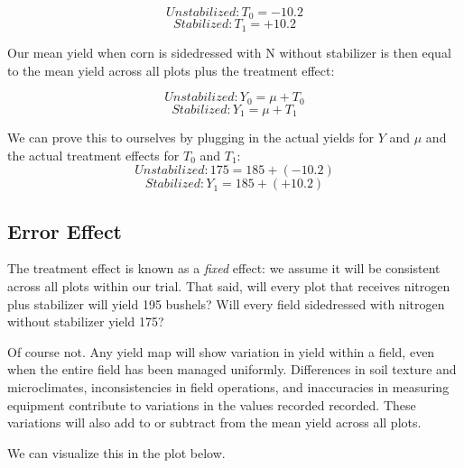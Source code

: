 \documentclass[
]{book}
\begin{document}
\[Unstabilized : T_0 = -10.2\]
\[Stabilized: T_1 = +10.2\]

Our mean yield when corn is sidedressed with N without stabilizer is then equal to the mean yield across all plots plus the treatment effect:

\[Unstabilized: Y_0 = \mu + T_0 \]
\[Stabilized: Y_1 = \mu + T_1 \]

We can prove this to ourselves by plugging in the actual yields for \(Y\) and \(\mu\) and the actual treatment effects for \(T_0\) and \(T_1\):
\[ Unstabilized: 175 = 185 + (-10.2) \]
\[Stabilized: Y_1 = 185 + (+10.2) \]

\hypertarget{error-effect}{%
\subsection{Error Effect}\label{error-effect}}

The treatment effect is known as a \emph{fixed} effect: we assume it will be consistent across all plots within our trial. That said, will every plot that receives nitrogen plus stabilizer will yield 195 bushels? Will every field sidedressed with nitrogen without stabilizer yield 175?

Of course not. Any yield map will show variation in yield within a field, even when the entire field has been managed uniformly. Differences in soil texture and microclimates, inconsistencies in field operations, and inaccuracies in measuring equipment contribute to variations in the values recorded recorded. These variations will also add to or subtract from the mean yield across all plots.

We can visualize this in the plot below.
\end{document}
